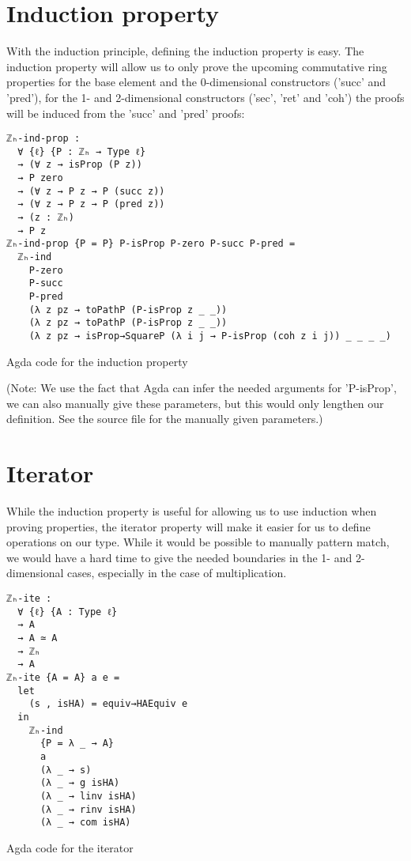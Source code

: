 \section{Induction property}

With the induction principle, defining the induction property is easy. The induction property will allow us to only prove the upcoming commutative ring properties for the base element and the 0-dimensional constructors ('succ' and 'pred'), for the 1- and 2-dimensional constructors ('sec', 'ret' and 'coh') the proofs will be induced from the 'succ' and 'pred' proofs:
\begin{listing}[H]
\begin{verbatim}
ℤₕ-ind-prop :
  ∀ {ℓ} {P : ℤₕ → Type ℓ}
  → (∀ z → isProp (P z))
  → P zero
  → (∀ z → P z → P (succ z))
  → (∀ z → P z → P (pred z))
  → (z : ℤₕ)
  → P z
ℤₕ-ind-prop {P = P} P-isProp P-zero P-succ P-pred =
  ℤₕ-ind
    P-zero
    P-succ
    P-pred
    (λ z pz → toPathP (P-isProp z _ _))
    (λ z pz → toPathP (P-isProp z _ _))
    (λ z pz → isProp→SquareP (λ i j → P-isProp (coh z i j)) _ _ _ _)
\end{verbatim}
\caption{Agda code for the induction property}
\end{listing}
(Note: We use the fact that Agda can infer the needed arguments for 'P-isProp', we can also manually give these parameters, but this would only lengthen our definition. See the source file for the manually given parameters.)

\section{Iterator}
While the induction property is useful for allowing us to use induction when proving properties, the iterator property will make it easier for us to define operations on our type. While it would be possible to manually pattern match, we would have a hard time to give the needed boundaries in the 1- and 2-dimensional cases, especially in the case of multiplication.

\begin{listing}[H]
\begin{verbatim}
ℤₕ-ite :
  ∀ {ℓ} {A : Type ℓ}
  → A
  → A ≃ A
  → ℤₕ
  → A
ℤₕ-ite {A = A} a e =
  let
    (s , isHA) = equiv→HAEquiv e
  in
    ℤₕ-ind
      {P = λ _ → A}
      a
      (λ _ → s)
      (λ _ → g isHA)
      (λ _ → linv isHA)
      (λ _ → rinv isHA)
      (λ _ → com isHA)
\end{verbatim}
\caption{Agda code for the iterator}
\end{listing}
